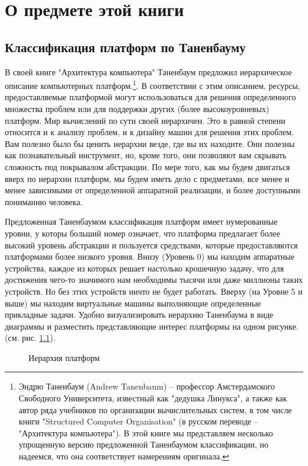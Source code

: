 \chapter{О предмете этой книги}
\section{Классификация платформ по Таненбауму}

В своей книге "Архитектура компьютера" Таненбаум предложил иерархическое описание компьютерных платформ.\footnote{Эндрю Таненбаум (Andrew Tanenbaum) -- профессор  Амстердамского Свободного Университета, известный как "дедушка Линукса", а также как автор ряда учебников по организации вычислительных систем,  в том числе книги "Structured Computer Organisation" (в русском переводе -- "Архитектура компьютера").  В этой книге мы представляем несколько упрощенную версию предложенной Таненбаумом классификации, но надеемся, что она соответствует намерениям оригинала.}.  
В соответствии с этим описанием, ресурсы, предоставляемые платформой могут использоваться для решения определенного множества проблем или для поддержки других (более высокоуровневых) платформ.  Мир вычислений по сути своей иерархичен.  Это в равной степени относится и к анализу проблем, и к дизайну машин для решения этих проблем.  Вам полезно было бы ценить иерархии везде, где вы их находите.  Они полезны как познавательный инструмент, но, кроме того, они позволяют вам скрывать сложность под покрывалом абстракции.  По мере того, как мы будем двигаться вверх по иерархии платформ, мы будем иметь дело с предметами, все менее и менее зависимыми от определенной аппаратной реализации, и более доступными пониманию человека.

Предложенная Таненбаумом классификация платформ имеет нумерованные уровни, у которы больший номер означает, что платформа предлагает более высокий уровень абстракции и пользуется средствами, которые предоставляются платформами более низкого уровня.  Внизу (Уровень 0) мы находим аппаратные устройства, каждое из которых решает настолько крошечную задачу, что для достижения чего-то значимого нам необходимы тысячи или даже миллионы таких устройств.  Но без этих устройств ничто не будет работать.  Вверху (на Уровне 5 и выше) мы находим виртуальные машины выполняющие определенные прикладные задачи.  Удобно визуализировать иерархию Таненбаума в виде диаграммы и разместить представляющие интерес платформы на одном рисунке. (см. рис. \ref{levels}).
\begin{figure}
\caption{Иерархия платформ}\label{levels}
\end{figure}

